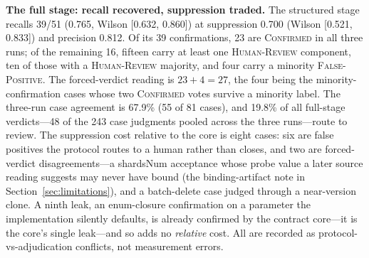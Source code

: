 \documentclass[acmsmall,screen,review,anonymous]{acmart}
\begin{document}
\textbf{The full stage: recall recovered, suppression traded.}
The structured stage recalls 39/51 (0.765, Wilson [0.632, 0.860]) at suppression 0.700 (Wilson [0.521, 0.833]) and precision 0.812. Of its 39 confirmations, 23 are \textsc{Confirmed} in all three runs; of the remaining 16, fifteen carry at least one \textsc{Human-Review} component, ten of those with a \textsc{Human-Review} majority, and four carry a minority \textsc{False-Positive}. The forced-verdict reading is $23+4=27$, the four being the minority-confirmation cases whose two \textsc{Confirmed} votes survive a minority label. The three-run case agreement is 67.9\% (55 of 81 cases), and 19.8\% of all full-stage verdicts---48 of the 243 case judgments pooled across the three runs---route to review. The suppression cost relative to the core is eight cases: six are false positives the protocol routes to a human rather than closes, and two are forced-verdict disagreements---a shardsNum acceptance whose probe value a later source reading suggests may never have bound (the binding-artifact note in Section~\ref{sec:limitations}), and a batch-delete case judged through a near-version clone. A ninth leak, an enum-closure confirmation on a parameter the implementation silently defaults, is already confirmed by the contract core---it is the core's single leak---and so adds no \emph{relative} cost. All are recorded as protocol-vs-adjudication conflicts, not measurement errors.
\end{document}
